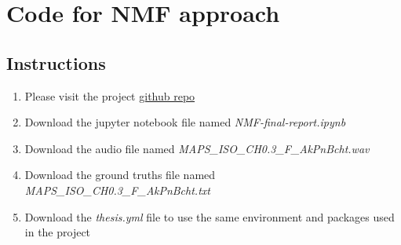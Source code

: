 \chapter{Code for NMF approach}
\label{append:nmf}
\vspace*{2em}

\section{Instructions}
\begin{enumerate}
    \item Please visit the project \href{https://github.com/OliverIgnetik/engn4200_thesis}{github repo}
    \item Download the jupyter notebook file named \emph{NMF-final-report.ipynb}
    \item Download the audio file named \emph{MAPS\_ISO\_CH0.3\_F\_AkPnBcht.wav}
    \item Download the ground truths file named \emph{MAPS\_ISO\_CH0.3\_F\_AkPnBcht.txt}
    \item Download the \emph{thesis.yml} file to use the same environment and packages used in the project
\end{enumerate}